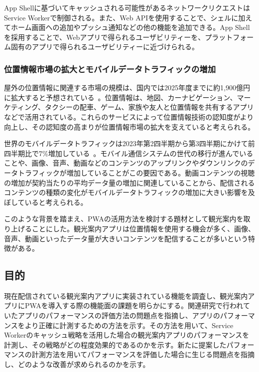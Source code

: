 App Shellに基づいてキャッシュされる可能性があるネットワークリクエストはService Workerで制御される。また、Web APIを使用することで、シェルに加えてホーム画面への追加やプッシュ通知などの他の機能を追加できる。App Shellを採用することで、Webアプリで得られるユーザビリティーを、プラットフォーム固有のアプリで得られるユーザビリティーに近づけられる。
\subsubsection{位置情報市場の拡大とモバイルデータトラフィックの増加}
\label{subsubsection:位置情報市場の拡大とモバイルデータトラフィックの増加}
屋外の位置情報に関連する市場の規模は、国内では2025年度までに約1,900億円に拡大すると予想されている~\cite{MIC2023InformationStatistics}。位置情報は、地図、カーナビゲーション、マーケティング、タクシーの配車、ゲーム、家族や友人と位置情報を共有するアプリなどで活用されている。これらのサービスによって位置情報技術の認知度がより向上し、その認知度の高まりが位置情報市場の拡大を支えていると考えられる。

世界のモバイルデータトラフィックは2023年第2四半期から第3四半期にかけて前四半期比で7\%増加している~\cite{EricssonNovember2023MobilityReportDataAndForecasts}。モバイル通信システムの世代の移行が進んでいることや、画像、音声、動画などのコンテンツのアップリンクやダウンリンクのデータトラフィックが増加していることがこの要因である。動画コンテンツの視聴の増加が契約当たりの平均データ量の増加に関連していることから、配信されるコンテンツの種類の変化がモバイルデータトラフィックの増加に大きい影響を及ぼしていると考えられる。

このような背景を踏まえ、PWAの活用方法を検討する題材として観光案内を取り上げることにした。観光案内アプリは位置情報を使用する機会が多く、画像、音声、動画といったデータ量が大きいコンテンツを配信することが多いという特徴がある。

\subsection{目的}
\label{subsection:目的}
現在配信されている観光案内アプリに実装されている機能を調査し、観光案内アプリにPWAを導入する際の機能面の課題を明らかにする。関連研究で行われていたアプリのパフォーマンスの評価方法の問題点を指摘し、アプリのパフォーマンスをより正確に計測するための方法を示す。その方法を用いて、Service Workerのキャッシュ戦略を活用した場合の観光案内アプリのパフォーマンスを計測し、その戦略がどの程度効果的であるのかを示す。新たに提案したパフォーマンスの計測方法を用いてパフォーマンスを評価した場合に生じる問題点を指摘し、どのような改善が求められるのかを示す。
